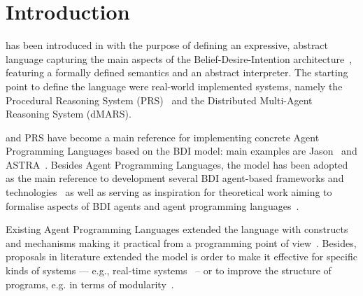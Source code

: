 \section{Introduction}
\label{sec:intro}


%
%
{\asl} has been introduced in \cite{Rao96}  with the purpose of defining an expressive, 
abstract language capturing the main aspects of the Belief-Desire-Intention architecture~\cite{Bratman88,Georgeff:1987:RRP:1863766.1863818}, featuring a formally defined semantics and an abstract interpreter.
%
The starting point to define the language were real-world implemented systems, namely the
Procedural Reasoning System (PRS)~\cite{Ingrand:1992:ARR:629535.629890} and the Distributed Multi-Agent Reasoning System (dMARS).
%

%
% 
{\asl}  and PRS have become a main reference for implementing concrete Agent Programming Languages 
based on the BDI model: 
%
main examples are Jason~\cite{jason06,bordini:07} and ASTRA~\cite{DBLP:conf/prima/CollierRL15}.
%
Besides Agent Programming Languages, the {\asl} model has been adopted
as the main reference to development several BDI agent-based
frameworks and technologies~\cite{BordiniMAPlpa,BordiniMAPlta} as well
as serving as inspiration for theoretical work aiming to formalise
aspects of BDI agents and agent programming
languages~\cite{DBLP:conf/kr/WinikoffPHT02,DBLP:conf/promas/DennisFBFW07,DBLP:journals/aamas/BordiniFVW06}.


%
%
Existing Agent Programming Languages extended the language with
constructs and mechanisms making it practical from a programming point
of view~\cite{jason06}.
%
Besides, proposals in literature extended the model is order to make
it effective for specific kinds of systems --- e.g., real-time
systems~\cite{Vikhorev:2011:APP:2030470.2030529} -- or to
improve the structure of programs, e.g. in terms of
modularity~\cite{Madden2010,Nunes2014}.

